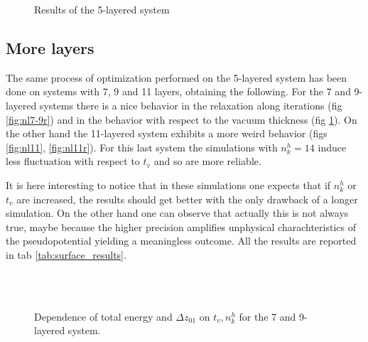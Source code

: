 \documentclass[a4paper, 11pt]{article}
\begin{document}
    \begin{figure}[H]
      \centering
      \begin{subfigure}[Behavior of total energy and $\Delta z_{01}$ with respect to $t_v$ with 10 horizontal n k points.]{
        \label{fig:nl5_nk10}}
      \end{subfigure}
      \begin{subfigure}[Relaxation of the layers during the simulation. Solid line with $t_v = 18\ \text{a.u.}, n_k^h = 10$; dashed line with $t_v = 25\ \text{a.u.}, n_k^h = 12$]{
        \label{fig:nl5_relaxation}}
      \end{subfigure}
      \caption{Results of the 5-layered system}
    \end{figure}

  \subsection{More layers}
    The same process of optimization performed on the 5-layered system has been done on systems with 7, 9 and 11 layers, obtaining the following.
    For the 7 and 9-layered systems there is a nice behavior in the relaxation along iterations (fig \ref{fig:nl7-9r}) and in the behavior with respect to the vacuum thickness (fig \ref{fig:nl7-9}). On the other hand the 11-layered system exhibits a more weird behavior (figs \ref{fig:nl11}, \ref{fig:nl11r}). For this last system the simulations with $n_k^h = 14$ induce less fluctuation with respect to $t_v$ and so are more reliable.

    It is here interesting to notice that in these simulations one expects that if $n_k^h$ or $t_v$ are increased, the results should get better with the only drawback of a longer simulation. On the other hand one can observe that actually this is not always true, maybe because the higher precision amplifies unphysical charachteristics of the pseudopotential yielding a meaningless outcome.
    All the results are reported in tab \ref{tab:surface_results}.

    \begin{figure}
      \centering
      \\
      \\
      \caption{Dependence of total energy and $\Delta z_{01}$ on $t_v, n_k^h$ for the 7 and 9-layered system.}
      \label{fig:nl7-9}
    \end{figure}
\end{document}
